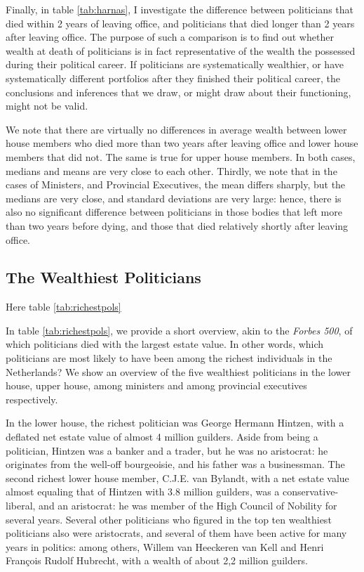     Finally, in table \ref{tab:harnas}, I investigate the difference between politicians that died within 2 years of leaving office, and politicians that died longer than 2 years after leaving office. The purpose of such a comparison is to find out whether wealth at death of politicians is in fact representative of the wealth the possessed during their political career. If politicians are systematically wealthier, or have systematically different portfolios after they finished their political career, the conclusions and inferences that we draw, or might draw about their functioning, might not be valid. 
    
    We note that there are virtually no differences in average wealth between lower house members who died more than two years after leaving office and lower house members that did not. The same is true for upper house members. In both cases, medians and means are very close to each other. Thirdly, we note that in the cases of Ministers, and Provincial Executives, the mean differs sharply, but the medians are very close, and standard deviations are very large: hence, there is also no significant difference between politicians in those bodies that left more than two years before dying, and those that died relatively shortly after leaving office.
    
\subsection{The Wealthiest Politicians}
    
    \begin{center}
    Here table \ref{tab:richestpols}
    \end{center}

    In table \ref{tab:richestpols}, we provide a short overview, akin to the \textit{Forbes 500}, of which politicians died with the largest estate value. In other words, which politicians are most likely to have been among the richest individuals in the Netherlands? We show an overview of the five wealthiest politicians in the lower house, upper house, among ministers and among provincial executives respectively. 
    
    In the lower house, the richest politician was George Hermann Hintzen, with a deflated net estate value of almost 4 million guilders. Aside from being a politician, Hintzen was a banker and a trader, but he was no aristocrat: he originates from the well-off bourgeoisie, and his father was a businessman. The second richest lower house member, C.J.E. van Bylandt, with a net estate value almost equaling that of Hintzen with 3.8 million guilders, was a conservative-liberal, and an aristocrat: he was member of the High Council of Nobility for several years. Several other politicians who figured in the top ten wealthiest politicians also were aristocrats, and several of them have been active for many years in politics: among others, Willem van Heeckeren van Kell and Henri François Rudolf Hubrecht, with a wealth of about 2,2 million guilders.
    
